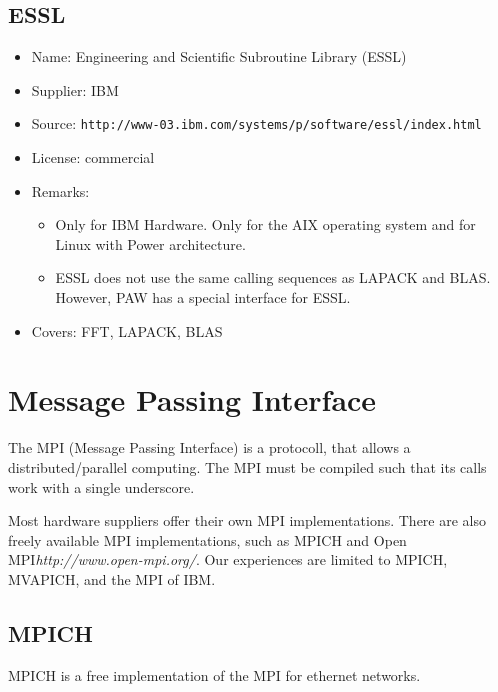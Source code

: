 \documentclass[a4paper,10pt]{report}
\newcommand{\mytt}[1]{{\tt #1}}
\begin{document}
\subsection{ESSL}
\begin{itemize}
\item Name: Engineering and Scientific Subroutine Library (ESSL)
\item Supplier: IBM
\item Source: \mytt{http://www-03.ibm.com/systems/p/software/essl/index.html}
\item License: commercial
\item Remarks: 
\begin{itemize}
\item Only for IBM Hardware. Only for the AIX operating
system and for  Linux with Power architecture.
\item ESSL does not use the same calling sequences as LAPACK and
BLAS. However, PAW has a special interface for ESSL.
\end{itemize}
\item Covers: FFT, LAPACK, BLAS
\end{itemize}

\newpage
\section{Message Passing Interface}
The MPI (Message Passing Interface) is a protocoll, that allows a
distributed/parallel computing. The MPI must be compiled such that its
calls work with a single underscore.

Most hardware suppliers offer their own MPI implementations. 
There are also freely available MPI implementations, such as  MPICH and Open
MPI\textit{http://www.open-mpi.org/}. Our experiences are limited to
 MPICH,  MVAPICH, and the MPI of IBM.

\subsection{MPICH}
\label{sec:mpich}
MPICH is a free implementation of the MPI for  ethernet networks.
\end{document}

